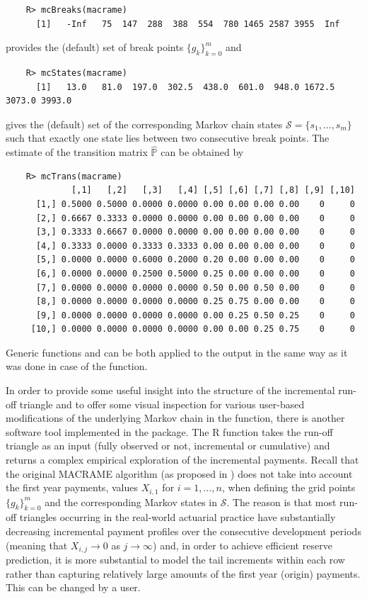 \begin{verbatim}
    R> mcBreaks(macrame)
      [1]   -Inf   75  147  288  388  554  780 1465 2587 3955  Inf
\end{verbatim}
provides the (default) set of break points $\{g_k\}_{k = 0}^m$ and
\begin{verbatim}
    R> mcStates(macrame)
      [1]   13.0   81.0  197.0  302.5  438.0  601.0  948.0 1672.5 3073.0 3993.0
\end{verbatim}
gives the (default) set of the corresponding Markov chain states $\mathcal{S} = \{s_1, \dots, s_m\}$ such that exactly one state lies between two consecutive break points. The estimate of the transition matrix $\widehat{\mathbb{P}}$ can be obtained by 
\begin{verbatim}
    R> mcTrans(macrame)
             [,1]   [,2]   [,3]   [,4] [,5] [,6] [,7] [,8] [,9] [,10]
      [1,] 0.5000 0.5000 0.0000 0.0000 0.00 0.00 0.00 0.00    0     0
      [2,] 0.6667 0.3333 0.0000 0.0000 0.00 0.00 0.00 0.00    0     0
      [3,] 0.3333 0.6667 0.0000 0.0000 0.00 0.00 0.00 0.00    0     0
      [4,] 0.3333 0.0000 0.3333 0.3333 0.00 0.00 0.00 0.00    0     0
      [5,] 0.0000 0.0000 0.6000 0.2000 0.20 0.00 0.00 0.00    0     0
      [6,] 0.0000 0.0000 0.2500 0.5000 0.25 0.00 0.00 0.00    0     0
      [7,] 0.0000 0.0000 0.0000 0.0000 0.50 0.00 0.50 0.00    0     0
      [8,] 0.0000 0.0000 0.0000 0.0000 0.25 0.75 0.00 0.00    0     0
      [9,] 0.0000 0.0000 0.0000 0.0000 0.00 0.25 0.50 0.25    0     0
     [10,] 0.0000 0.0000 0.0000 0.0000 0.00 0.00 0.25 0.75    0     0
        \end{verbatim}
Generic functions  and  can be both applied to the output in the same way as it was done in case of the  function.  

In order to provide some useful insight into the structure of the incremental run-off triangle and to offer some visual inspection for various user-based modifications of the underlying Markov chain in the  function, 
there is another software tool implemented in the  package. The R function  takes the run-off triangle as an input (fully observed or not, incremental or cumulative) and returns a complex empirical exploration of the incremental payments.
Recall that the original MACRAME algorithm (as proposed in \cite{MMP2022}) does not take into account the first year payments, values $X_{i,1}$ for $i = 1, \dots, n$, when defining the  grid points $\{g_k\}_{k = 0}^m$ and the corresponding  Markov states in $\mathcal{S}$. The  reason is that most run-off triangles occurring in the real-world actuarial practice have substantially decreasing incremental payment profiles over the consecutive development periods (meaning that $X_{i,j} \to 0$ as $j \to \infty$) and, in order to achieve efficient reserve prediction, it is  more substantial to model 
the tail increments within each row rather than capturing relatively large amounts of the first year (origin) payments.
This can be changed by a user. 

